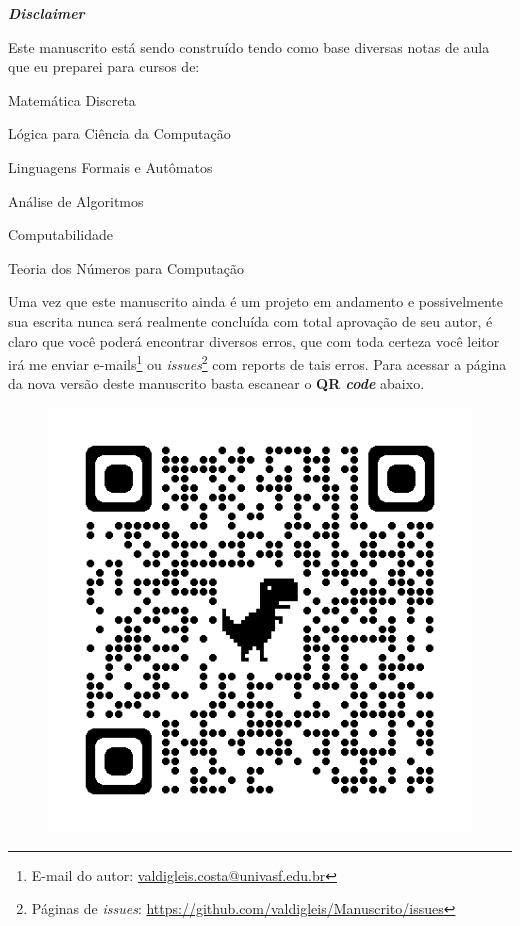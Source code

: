 \begingroup
\thispagestyle{empty}
\begin{center}
	{\normalfont\fontsize{20}{20}\sffamily\selectfont \textbf{\textit{Disclaimer}}}\par
\end{center}

\vspace{1cm}

Este manuscrito está sendo construído tendo como base diversas notas de aula que eu preparei para cursos de:

\begin{multicols}{2}
	\begin{fieldsList}
		\item Matemática Discreta
		\item Lógica para Ciência da Computação
		\item Linguagens Formais e Autômatos
		\item Análise de Algoritmos
		\item Computabilidade
		\item Teoria dos Números para Computação
	\end{fieldsList}
\end{multicols}	

Uma vez que este manuscrito ainda é um projeto em andamento e possivelmente sua escrita nunca será realmente concluída com total aprovação de seu autor, é claro que você poderá encontrar diversos erros, que com toda certeza você leitor irá me enviar e-mails\footnote{E-mail do autor: \url{valdigleis.costa@univasf.edu.br}} ou \textit{issues}\footnote{Páginas de \textit{issues}: \url{https://github.com/valdigleis/Manuscrito/issues}} com reports de tais erros. Para acessar a página da nova versão deste manuscrito basta escanear o \textbf{QR \textit{code}} abaixo.

\begin{figure}[h]
	\centering
	\includegraphics[width=0.4\linewidth]{figures/qrcode}
\end{figure}


\endgroup
\newpage